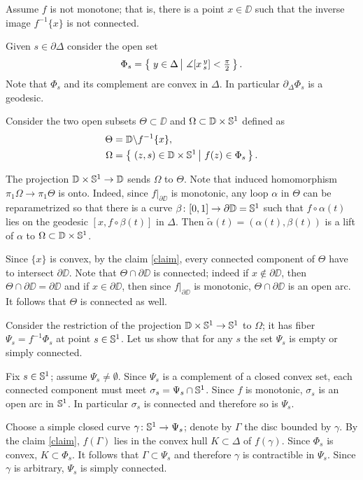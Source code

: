 \documentclass{article}
\begin{document}
Assume $f$ is not monotone;
that is, there is a point $x\in \DD$ such that the inverse image $f^{-1}\{x\}$ is not connected.

Given $s\in\partial \Delta$ consider the open set
\[\Phi_s=\set{y\in\Delta}{\measuredangle [x\,^y_s]<\tfrac\pi2}.\]
Note that $\Phi_s$ and its complement are convex in $\Delta$.
In particular $\partial_\Delta\Phi_s$ is a geodesic.

Consider the two open subsets $\Theta\subset \DD$ and $\Omega\subset  \mathbb{D}\times\mathbb{S}^1$ defined as
\begin{align*}
\Theta&=\DD\backslash f^{-1}\{x\},
\\
\Omega&=\set{(z,s)\in \DD\times\SS^1}{f(z)\in \Phi_s}.
\end{align*}

The  projection $\mathbb{D}\times\mathbb{S}^1\to \mathbb{D}$ sends $\Omega$ to $\Theta$.
Note that induced homomorphism $\pi_1\Omega\to \pi_1\Theta$ is onto.
Indeed, since $f|_{\partial\DD}$ is monotonic, any loop $\alpha$ in $\Theta$ can be reparametrized so that there is a curve $\beta\colon[0,1]\to \partial\mathbb{D}=\mathbb{S}^1$ such that 
$f\circ\alpha(t)$ lies on the geodesic $[x,f\circ\beta(t)]$ in $\Delta$.
Then $\tilde\alpha(t)=(\alpha(t),\beta(t))$ is a lift of $\alpha$ to $\Omega\subset\mathbb{D}\times\mathbb{S}^1$.

Since $\{x\}$ is convex, by the claim \ref{claim}, every connected component of $\Theta$ have to intersect $\partial\DD$.
Note that $\Theta\cap \partial\DD$ is connected;
indeed if $x\notin \partial\DD$, then $\Theta\cap \partial\DD=\partial \DD$
and if $x\in \partial\DD$, then since $f|_{\partial\DD}$ is monotonic, $\Theta\cap \partial\DD$ is an open arc.
It follows that $\Theta$ is connected as well.


Consider the restriction of the projection $\mathbb{D}\times\mathbb{S}^1\to \mathbb{S}^1$ to $\Omega$;
it has fiber $\Psi_s=f^{-1}\Phi_s$ at point $s\in\mathbb{S}^1$.
Let us show that for any $s$ the set $\Psi_s$ is empty or simply connected.

Fix $s\in\mathbb{S}^1$; assume $\Psi_s\ne \emptyset$.
Since $\Psi_s$ is a complement of a closed convex set,
each connected component must meet $\sigma_s=\Psi_s\cap\mathbb{S}^1$.
Since $f$ is monotonic, $\sigma_s$ is an open arc in $\mathbb{S}^1$.
In particular $\sigma_s$ is connected and therefore so is $\Psi_s$.

Choose a simple closed curve $\gamma\colon\mathbb{S}^1\to\Psi_s$;
denote by $\Gamma$ the disc bounded by $\gamma$.
By the claim \ref{claim}, $f(\Gamma)$ lies in the convex hull $K\subset \Delta$ of $f(\gamma)$.
Since $\Phi_s$ is convex,  $K\subset \Phi_s$.
It follows that $\Gamma\subset\Psi_s$ and therefore $\gamma$ is contractible in $\Psi_s$.
Since $\gamma$ is arbitrary, $\Psi_s$ is simply connected.
\end{document}

